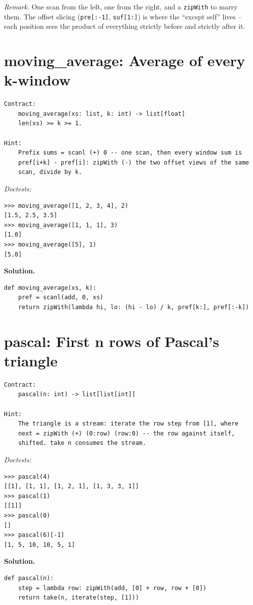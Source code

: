 \documentclass[11pt,letterpaper]{book}
\begin{document}
\noindent\textit{Remark.} One scan from the left, one from the right, and a
\texttt{zipWith} to marry them. The offset slicing (\texttt{pre[:-1]},
\texttt{suf[1:]}) is where the ``except self'' lives -- each position sees the
product of everything strictly before and strictly after it.

\section{moving\_average: Average of every k-window}
\begin{lstlisting}[style=spec]
Contract:
    moving_average(xs: list, k: int) -> list[float]
    len(xs) >= k >= 1.

Hint:
    Prefix sums = scanl (+) 0 -- one scan, then every window sum is
    pref[i+k] - pref[i]: zipWith (-) the two offset views of the same
    scan, divide by k.
\end{lstlisting}
\noindent\textit{Doctests:}
\begin{lstlisting}[style=spec]
>>> moving_average([1, 2, 3, 4], 2)
[1.5, 2.5, 3.5]
>>> moving_average([1, 1, 1], 3)
[1.0]
>>> moving_average([5], 1)
[5.0]
\end{lstlisting}
\noindent\textbf{Solution.}
\begin{lstlisting}[style=code]
def moving_average(xs, k):
    pref = scanl(add, 0, xs)
    return zipWith(lambda hi, lo: (hi - lo) / k, pref[k:], pref[:-k])
\end{lstlisting}

\section{pascal: First n rows of Pascal's triangle}
\begin{lstlisting}[style=spec]
Contract:
    pascal(n: int) -> list[list[int]]

Hint:
    The triangle is a stream: iterate the row step from [1], where
    next = zipWith (+) (0:row) (row:0) -- the row against itself,
    shifted. take n consumes the stream.
\end{lstlisting}
\noindent\textit{Doctests:}
\begin{lstlisting}[style=spec]
>>> pascal(4)
[[1], [1, 1], [1, 2, 1], [1, 3, 3, 1]]
>>> pascal(1)
[[1]]
>>> pascal(0)
[]
>>> pascal(6)[-1]
[1, 5, 10, 10, 5, 1]
\end{lstlisting}
\noindent\textbf{Solution.}
\begin{lstlisting}[style=code]
def pascal(n):
    step = lambda row: zipWith(add, [0] + row, row + [0])
    return take(n, iterate(step, [1]))
\end{lstlisting}
\end{document}
